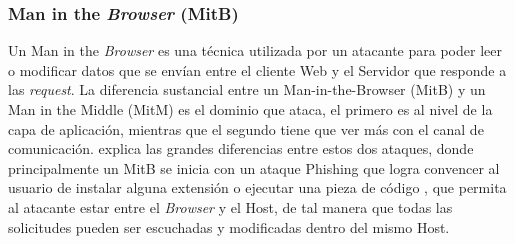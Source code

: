 	\subsubsection{Man in the \textit{Browser} (MitB)}
    Un Man in the \textit{Browser} es una técnica utilizada por un atacante para poder leer o modificar datos que se envían entre el cliente Web y el Servidor que responde a las \textit{request}. La diferencia sustancial entre un Man-in-the-Browser (MitB) y un Man in the Middle (MitM) es el dominio que ataca, el primero es al nivel de la capa de aplicación, mientras que el segundo tiene que ver más con el canal de comunicación. \cite{Dougan2012} explica las grandes diferencias entre estos dos ataques, donde principalmente un MitB se inicia con un ataque Phishing que logra convencer al usuario de instalar alguna extensión o ejecutar una pieza de código \cite{Utakrit2009, Paola2006}, que permita al atacante estar entre el \textit{Browser} y el Host, de tal manera que todas las solicitudes pueden ser escuchadas y modificadas dentro del mismo Host.









